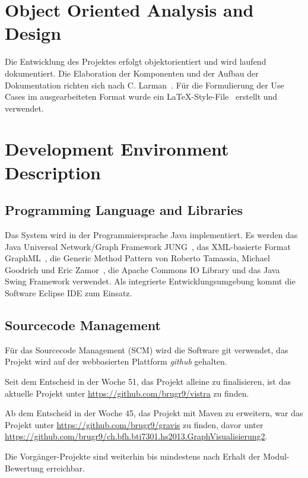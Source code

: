 \section{Object Oriented Analysis and Design}
\label{sec:Object Oriented Analysis and Design}
Die Entwicklung des Projektes erfolgt objektorientiert und wird laufend dokumentiert. Die Elaboration der Komponenten und der Aufbau der Dokumentation richten sich nach C. Larman~\cite{larmann:2004}. F\"ur die Formulierung der Use Cases im ausgearbeiteten Format wurde ein \LaTeX-Style-File~\cite{bruggmann:2013} erstellt und verwendet.
% 
\section{Development Environment Description}
\label{sec:Development Environment Description}
% 
\subsection{Programming Language and Libraries}
\label{subsec:Programming Language and Libraries}
Das System wird in der Programmiersprache Java implementiert. Es werden das Java Universal Network/Graph Framework JUNG~\cite{jung:2013}, das XML-basierte Format GraphML~\cite{graphml:2013}, die Generic Method Pattern von Roberto Tamassia, Michael Goodrich und Eric Zamor~\cite{tamassiagoodrichzamor:2013}, die Apache Commons IO Library und das Java Swing Framework verwendet. Als integrierte Entwicklungsumgebung kommt die Software Eclipse IDE zum Einsatz.
% 
\subsection{Sourcecode Management}
\label{subsec:Sourcecode Management}
F\"ur das Sourcecode Management (SCM) wird die Software git verwendet, das Projekt wird auf der webbasierten Plattform \textit{github} gehalten.

Seit dem Entscheid in der Woche 51, das Projekt alleine zu finalisieren, ist das aktuelle Projekt unter \url{https://github.com/brugr9/vistra} zu finden. 

Ab dem Entscheid in der Woche 45, das Projekt mit Maven zu erweitern, war das Projekt unter \url{https://github.com/brugr9/gravis} zu finden, davor unter \url{https://github.com/brugr9/ch.bfh.bti7301.hs2013.GraphVisualisierung2}.

Die Vorg\"anger-Projekte sind weiterhin bis mindestens nach Erhalt der Modul-Bewertung erreichbar.